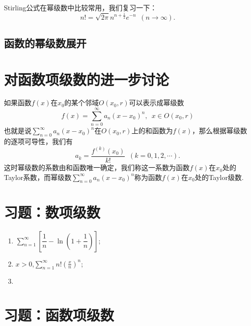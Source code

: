 \begin{theorem}[和函数连续性]

\end{theorem}

\begin{theorem}[逐项可积性]

\end{theorem}

\begin{theorem}[逐项可微性]

\end{theorem}


Stirling公式在幂级数中比较常用，我们复习一下：\[n!=\sqrt{2\pi}n^{n+\frac{1}{2}}e^{-n}\enspace (n\to\infty).\]
\subsection{函数的幂级数展开}

\section{对函数项级数的进一步讨论}
    如果函数\(f(x)\)在\(x_0\)的某个邻域\(O(x_0,r)\)可以表示成幂级数\[f(x)=\sum_{n=0}^{\infty}a_n(x-x_0)^n,\enspace x\in O(x_0,r)\]
    也就是说\(\sum_{n=0}^{\infty}a_n(x-x_0)^n\)在\(O(x_0,r)\)上的和函数为\(f(x)\)，那么根据幂级数的逐项可导性，我们有\[a_k=\frac{f^{(k)}(x_0)}{k!}\enspace(k=0,1,2,\cdots).\]这时幂级数的系数由和函数唯一确定，我们称这一系数为函数\(f(x)\)在\(x_0\)处的{\heiti Taylor系数}，而幂级数\(\sum_{n=0}^{\infty}a_n(x-x_0)^n\)称为函数\(f(x)\)在\(x_0\)处的{\heiti Taylor级数}.
    
\begin{theorem}[Bernstein]

\end{theorem}



\section{习题：数项级数}
\begin{exercise}[判断下列正项级数的敛散性]
    \begin{enumerate}
        \item \(\displaystyle\sum\limits_{n=1}^{\infty}\left[\dfrac{1}{n}-\ln(1+\dfrac{1}{n})\right]\);
        \item \(x>0\),\enspace\(\displaystyle\sum\limits_{n=1}^{\infty}n!(\frac{x}{n})^n\);
        \item 
    \end{enumerate}
\end{exercise}
\section{习题：函数项级数}